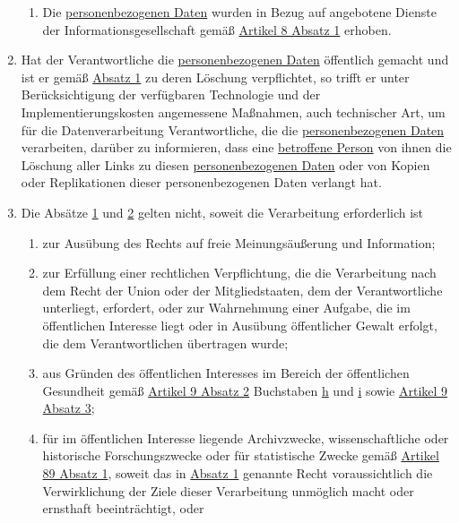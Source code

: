 \begin{enumerate}
\begin{enumerate}
    \item Die \hyperref[itm:04-1]{personenbezogenen Daten} wurden in Bezug auf angebotene Dienste der Informationsgesellschaft gemäß
     \hyperref[itm:08-1]{Artikel 8 Absatz 1} erhoben.
    \label{itm:17-1f}

  \end{enumerate}

  \item Hat der Verantwortliche die \hyperref[itm:04-1]{personenbezogenen Daten} öffentlich gemacht und ist er gemäß \hyperref[itm:17-1]
   {Absatz 1} zu deren Löschung verpflichtet, so trifft er unter Berücksichtigung der verfügbaren Technologie und der
   Implementierungskosten angemessene Maßnahmen, auch technischer Art, um für die Datenverarbeitung Verantwortliche,
   die die \hyperref[itm:04-1]{personenbezogenen Daten} verarbeiten, darüber zu informieren, dass eine \hyperref[itm:04-1]{betroffene Person} von ihnen die
   Löschung aller Links zu diesen \hyperref[itm:04-1]{personenbezogenen Daten} oder von Kopien oder Replikationen dieser personenbezogenen
   Daten verlangt hat.
  \label{itm:17-2}

  \item Die Absätze \hyperref[itm:17-1]{1} und \hyperref[itm:17-2]{2} gelten nicht, soweit die Verarbeitung erforderlich
   ist
  \label{itm:17-3}

  \begin{enumerate}
  
    \item zur Ausübung des Rechts auf freie Meinungsäußerung und Information;
    \label{itm:17-3a}

    \item zur Erfüllung einer rechtlichen Verpflichtung, die die Verarbeitung nach dem Recht der Union oder der
     Mitgliedstaaten, dem der Verantwortliche unterliegt, erfordert, oder zur Wahrnehmung einer Aufgabe, die im
     öffentlichen Interesse liegt oder in Ausübung öffentlicher Gewalt erfolgt, die dem Verantwortlichen übertragen
     wurde;
    \label{itm:17-3b}

    \item aus Gründen des öffentlichen Interesses im Bereich der öffentlichen Gesundheit gemäß \hyperref[itm:09-2]
     {Artikel 9 Absatz 2} Buchstaben \hyperref[itm:09-2h]{h} und \hyperref[itm:09-2i]{i} sowie \hyperref[itm:09-3]
     {Artikel 9 Absatz 3};
    \label{itm:17-3c}

    \item für im öffentlichen Interesse liegende Archivzwecke, wissenschaftliche oder historische Forschungszwecke oder
     für statistische Zwecke gemäß \hyperref[itm:89-1]{Artikel 89 Absatz 1}, soweit das in \hyperref[itm:17-1]
     {Absatz 1} genannte Recht voraussichtlich die Verwirklichung der Ziele dieser Verarbeitung unmöglich macht oder
     ernsthaft beeinträchtigt, oder
    \label{itm:17-3d}


\end{enumerate}
\end{enumerate}
